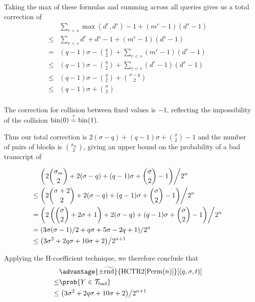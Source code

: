 \documentclass[hctr.tex]{subfiles}
\begin{document}
Taking the max of these formulas and summing across
all queries gives us a total correction of
\begin{align*}
    &\sum_{r < s} \max(d^r, d^s) -1 + (m^r -1 )(d^s -1)\\
    \leq & \sum_{r < s} d^r + d^s -1 + (m^r -1 )(d^s -1)\\
    = & (q-1)\sigma - \binom{q}{2} + \sum_{r < s} (m^r -1 )(d^s -1) \\
    \leq & (q-1)\sigma - \binom{q}{2} + \sum_{r < s} (d^r -1)(d^s -1) \\
    \leq & (q-1)\sigma - \binom{q}{2} + \binom{\sigma - q}{2} \\
   \leq & (q-1)\sigma + \binom{\sigma}{2} \\
\end{align*}

The correction for collision between fixed values
is \(-1\), reflecting the impossibility of the collision
\(\operatorname{bin}(0) \stackrel{\text{?}}{=} \operatorname{bin}(1)\).

Thus our total correction is
\(2(\sigma - q) + (q-1)\sigma + \binom{\sigma}{2} -1\)
and the number of pairs of blocks is \(\binom{\sigma_m}{2}\), 
giving an upper bound
on the probability of a bad transcript of

\begin{align*}
    & \left.\left(2\binom{\sigma_m}{2} + 2(\sigma - q) + (q-1)\sigma + \binom{\sigma}{2} -1\right)\middle/2^n\right. \\
    \leq & \left.\left(2\binom{\sigma + 2}{2} + 2(\sigma - q) + (q-1)\sigma + \binom{\sigma}{2} -1\right)\middle/2^n\right. \\
    = & \left.\left(2\left(\binom{\sigma}{2} + 2\sigma + 1\right) + 2(\sigma - q) + (q-1)\sigma + \binom{\sigma}{2} -1\right)\middle/2^n\right. \\
    = & \left.\left(3\sigma(\sigma - 1)/2 + q\sigma + 5\sigma - 2q + 1\right)\middle/2^n\right. \\
    \leq & \left.\left(3\sigma^2 + 2q\sigma + 10\sigma + 2\right)\middle/2^{n+1}\right. \\
\end{align*}

Applying the H-coefficient technique, we therefore conclude that
\begin{align*}
    & \advantage{\pm\widetilde{\mathrm{rnd}}}{\HCTR[\Perm(n)]}[(q, \sigma, t)] \\
    \leq & \prob{Y \in \Tb} \\
    \leq & \left.\left(3\sigma^2 + 2q\sigma + 10\sigma + 2\right)\middle/2^{n+1}\right.
\end{align*}
\end{document}
